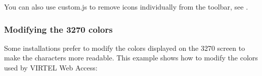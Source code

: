 \documentclass[letterpaper,10pt,english]{sphinxmanual}
\begin{document}
\begin{sphinxVerbatim}[commandchars=\\\{\}]
        
       
\end{sphinxVerbatim}


You can also use custom.js to remove icons individually from the toolbar, see {\hyperref[\detokenize{User_Guide:v457ug-remove-icons}]{}}.


\subsubsection{Modifying the 3270 colors}
\label{\detokenize{User_Guide:modifying-the-3270-colors}}
Some installations prefer to modify the colors displayed on the 3270 screen to make the characters more readable.
This example shows how to modify the colors used by VIRTEL Web Access:
\end{document}
